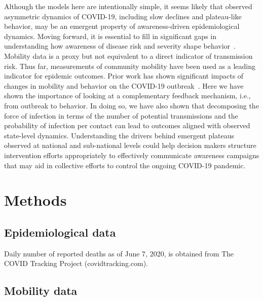 Although the models here are intentionally simple,
it seems likely that observed asymmetric dynamics of COVID-19, including
slow declines and plateau-like behavior, may be an emergent
property of awareness-driven epidemiological dynamics.
%
%
Moving forward, it is essential to fill in significant
gaps in understanding how awareness of disease
risk and severity shape behavior~\citep{west_nat2020}. 
Mobility data is a proxy but
not equivalent to a direct indicator of transmission
risk. Thus far, measurements of community
mobility have been
used as a leading indicator for epidemic outcomes.
Prior work has shown significant impacts of changes
in mobility and behavior on the COVID-19 outbreak~\citep{kraemer_2020sci}.
Here we have
shown the importance of looking at a complementary feedback
mechanism,
i.e., from outbreak to behavior.  
In doing so, we have also shown that decomposing the 
force of infection in terms of the number of potential
transmissions and the probability of infection per contact
can lead to outcomes aligned with observed state-level dynamics.
Understanding the drivers behind emergent plateaus observed
at national and sub-national levels could help decision
makers structure intervention efforts appropriately to effectively 
communicate awareness campaigns that may aid in collective
efforts to control the ongoing COVID-19 pandemic.

\section{Methods}

\subsection{Epidemiological data}

Daily number of reported deaths as of June 7, 2020, is obtained from The COVID Tracking Project (covidtracking.com).

\subsection{Mobility data}

